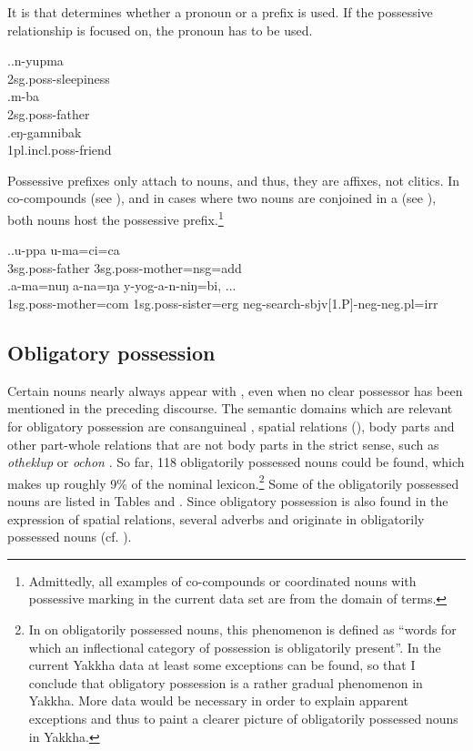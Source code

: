 It is  that determines whether a pronoun or a prefix is used. If the possessive relationship is focused on, the pronoun has to be used.

\ex.\ag.n-yupma\\
{\sc 2sg.poss-}sleepiness\\
\bg.m-ba\\
{\sc 2sg.poss-}father \\
\bg.eŋ-gamnibak\\
{\sc 1pl.incl.poss-}friend \\

\largerpage 
Possessive prefixes only attach to nouns, and thus, they are affixes, not clitics. In co-compounds (see \Next[a]), and in cases where two nouns are conjoined in a  (see \Next[b]), both nouns host the possessive prefix.\footnote{Admittedly, all examples of co-compounds or coordinated nouns with possessive marking in the current data set are from the domain of  terms.}

\ex.\ag.u-ppa   u-ma=ci=ca \\
{\sc 3sg.poss-}father {\sc 3sg.poss-}mother{\sc =nsg=add}\\
  
\bg.a-ma=nuŋ                a-na=ŋa                      y-yog-a-n-niŋ=bi, ...\\
{\sc 1sg.poss-}mother{\sc =com} {\sc 1sg.poss-}sister{\sc =erg} {\sc neg-}search{\sc -sbjv[1.P]-neg-neg.pl=irr}\\
  


\subsection{Obligatory  possession}\label{inh-poss}

Certain nouns nearly always  appear with , even when no clear possessor has been  mentioned in the preceding discourse. The semantic domains which are relevant for obligatory possession are consanguineal , spatial relations (),  body parts and other part-whole relations that are not body parts in the strict sense, such as \emph{otheklup}  or \emph{ochon} . So far, 118 obligatorily possessed nouns could be found, which makes up roughly 9\% of the nominal lexicon.\footnote{In  \citet[242]{Bickeletal2005_Obligatory} on obligatorily possessed nouns, this phenomenon is defined as “words for which an inflectional category of possession is obligatorily present”. In the current Yakkha data at least some exceptions can be found, so that I conclude that obligatory possession is a rather gradual phenomenon  in Yakkha. More data would be necessary in order to explain apparent exceptions and thus to paint a clearer picture of obligatorily possessed nouns in Yakkha.} Some of the  obligatorily possessed nouns are listed in Tables  and . Since obligatory possession is also found in the expression of spatial relations, several adverbs and  originate in obligatorily possessed nouns (cf. ).


